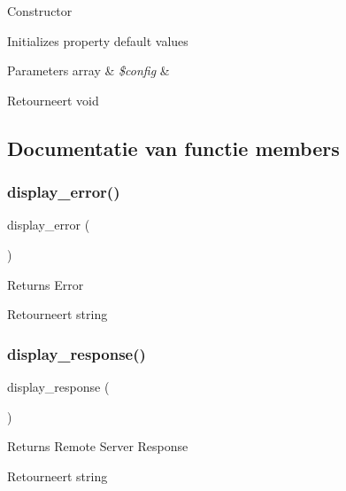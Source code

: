 Constructor

Initializes property default values


\begin{DoxyParams}[1]{Parameters}
array & {\em \$config} & \\
\hline
\end{DoxyParams}
\begin{DoxyReturn}{Retourneert}
void 
\end{DoxyReturn}


\subsection{Documentatie van functie members}
\mbox{\label{class_c_i___xmlrpc_adf0d809d39e17bc0e08387436db31386}} 
\subsubsection{\texorpdfstring{display\_error()}{display\_error()}}
{\footnotesize\ttfamily display\+\_\+error (\begin{DoxyParamCaption}{ }\end{DoxyParamCaption})}

Returns Error

\begin{DoxyReturn}{Retourneert}
string 
\end{DoxyReturn}
\mbox{\label{class_c_i___xmlrpc_a3a8aedc2a1e6a67ad248dc6078ce8614}} 
\subsubsection{\texorpdfstring{display\_response()}{display\_response()}}
{\footnotesize\ttfamily display\+\_\+response (\begin{DoxyParamCaption}{ }\end{DoxyParamCaption})}

Returns Remote Server Response

\begin{DoxyReturn}{Retourneert}
string 
\end{DoxyReturn}
\mbox{\label{class_c_i___xmlrpc_a481385e36d920f5a5005ace05c6cd016}} 
